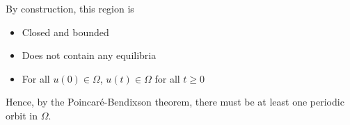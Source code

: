 \documentclass[12pt]{article}
\begin{document}
\begin{enumerate}[(i)]
          By construction, this region is
          \begin{itemize}
              \item Closed and bounded
              \item Does not contain any equilibria
              \item For all $u(0) \in \Omega$, $u(t) \in \Omega$ for all $t \geq 0$
          \end{itemize}

          Hence, by the Poincaré-Bendixson theorem, there must be at least one periodic orbit in $\Omega$.

\end{enumerate}
\pagebreak
\end{document}
